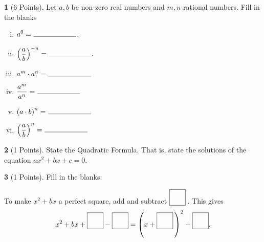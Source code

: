 \documentclass[12pt]{amsart}
\theoremstyle{definition}
\newtheorem{thm}{}
\theoremstyle{definition}
\begin{document}
\begin{thm}[6 Points]\label{ex2}
  Let $a, b$ be non-zero real numbers and $m, n$ rational numbers.
  Fill in the blanks
  \begin{multicols}{2}
    \begin{enumerate}[(i)]
    \item
      $\displaystyle{a^0 =\ \line(1,0){60}}$,
      \vspace{.15in}
    \item
      $\displaystyle{\left(\frac{a}{b}\right)^{-n} =\ \line(1,0){60}}.$
      \vspace{.15in}
    \item
      $\displaystyle{a^m \cdot a^n =\ \line(1,0){60}}$
      \vspace{.15in}
    \item
      $\displaystyle{\frac{a^m}{a^n} =\ \line(1,0){60}}$
      \vspace{.15in}
    \item
      $\displaystyle{\left(a \cdot b\right)^n =\ \line(1,0){60}}$
      \vspace{.15in}
    \item
      $\displaystyle{\left(\frac{a}{b}\right)^n =\ \line(1,0){60}}$
    \end{enumerate}
  \end{multicols}
\end{thm}

\begin{thm}[1 Points]\label{ex3}
  State the Quadratic Formula.
  That is, state the solutions of the equation $ax^2 + bx + c = 0$.
  \vspace{1in}
\end{thm}

\begin{thm}[1 Points]\label{ex4}
  Fill in the blanks:\\
  \begin{center}
    To make $x^2 + bx$ a perfect square, add and subtract $\fbox{\raisebox{16px}{\hspace{16px}}}$\,.
    This gives
    $$x^2 + bx + \fbox{\raisebox{16px}{\hspace{16px}}} - \fbox{\raisebox{16px}{\hspace{16px}}} = \left(x + \fbox{\raisebox{16px}{\hspace{16px}}}\,\right)^2 - \fbox{\raisebox{16px}{\hspace{16px}}}.$$
  \end{center}
\end{thm}
\end{document}
